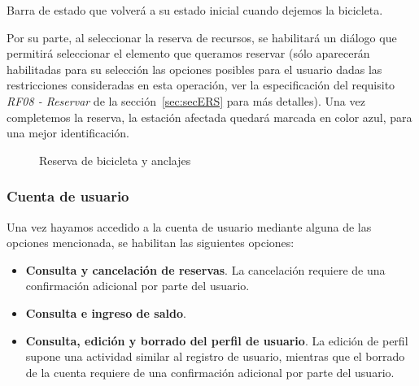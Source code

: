 \FloatBarrier
Barra de estado que volverá a su estado inicial cuando dejemos la bicicleta.

Por su parte, al seleccionar la reserva de recursos, se habilitará un diálogo que permitirá seleccionar el elemento que queramos reservar (sólo aparecerán habilitadas para su selección las opciones posibles para el usuario dadas las restricciones consideradas en esta operación, ver la especificación del requisito \emph{RF08 - Reservar} de la sección~\ref{sec:secERS} para más detalles). Una vez completemos la reserva, la estación afectada quedará marcada en color azul, para una mejor identificación.

\begin{figure} [!htb]
	\centering
	\caption{Reserva de bicicleta y anclajes}
	\label{fig:reservaBicisAnclajes}
\end{figure}

\subsubsection{Cuenta de usuario}

Una vez hayamos accedido a la cuenta de usuario mediante alguna de las opciones mencionada, se habilitan las siguientes opciones:

\begin{itemize}
	\item \textbf{Consulta y cancelación de reservas}. La cancelación requiere de una confirmación adicional por parte del usuario.
	\item \textbf{Consulta e ingreso de saldo}.
	\item \textbf{Consulta, edición y borrado del perfil de usuario}. La edición de perfil supone una actividad similar al registro de usuario, mientras que el borrado de la cuenta requiere de una confirmación adicional por parte del usuario.
\end{itemize}

